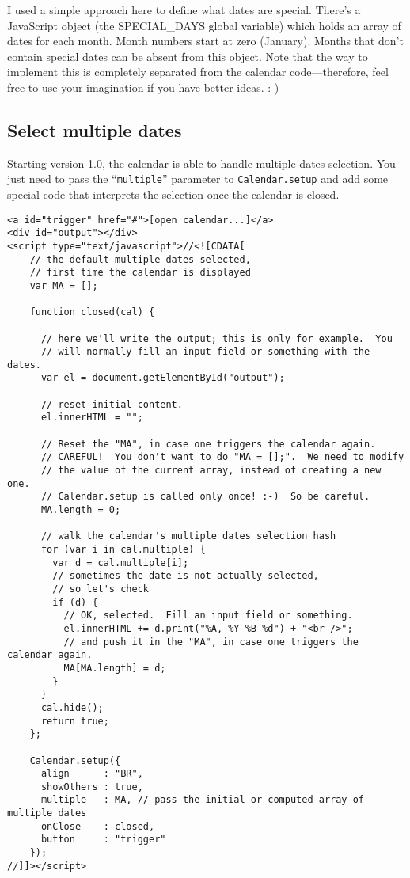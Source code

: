 \documentclass[a4paper,twoside,10pt]{dynadoc}
\begin{document}
I used a simple approach here to define what dates are special.  There's a
JavaScript object (the SPECIAL\_DAYS global variable) which holds an array
of dates for each month.  Month numbers start at zero (January).  Months
that don't contain special dates can be absent from this object.  Note that
the way to implement this is completely separated from the calendar
code---therefore, feel free to use your imagination if you have better
ideas. :-)

\subsection{Select multiple dates}

Starting version 1.0, the calendar is able to handle multiple dates
selection.  You just need to pass the “\texttt{multiple}” parameter to
\texttt{Calendar.setup} and add some special code that interprets the
selection once the calendar is closed.

\begin{verbatim}
<a id="trigger" href="#">[open calendar...]</a>
<div id="output"></div>
<script type="text/javascript">//<![CDATA[
    // the default multiple dates selected,
    // first time the calendar is displayed
    var MA = [];

    function closed(cal) {

      // here we'll write the output; this is only for example.  You
      // will normally fill an input field or something with the dates.
      var el = document.getElementById("output");

      // reset initial content.
      el.innerHTML = "";

      // Reset the "MA", in case one triggers the calendar again.
      // CAREFUL!  You don't want to do "MA = [];".  We need to modify
      // the value of the current array, instead of creating a new one.
      // Calendar.setup is called only once! :-)  So be careful.
      MA.length = 0;

      // walk the calendar's multiple dates selection hash
      for (var i in cal.multiple) {
        var d = cal.multiple[i];
        // sometimes the date is not actually selected,
        // so let's check
        if (d) {
          // OK, selected.  Fill an input field or something.
          el.innerHTML += d.print("%A, %Y %B %d") + "<br />";
          // and push it in the "MA", in case one triggers the calendar again.
          MA[MA.length] = d;
        }
      }
      cal.hide();
      return true;
    };

    Calendar.setup({
      align      : "BR",
      showOthers : true,
      multiple   : MA, // pass the initial or computed array of multiple dates
      onClose    : closed,
      button     : "trigger"
    });
//]]></script>
\end{verbatim}
\end{document}
